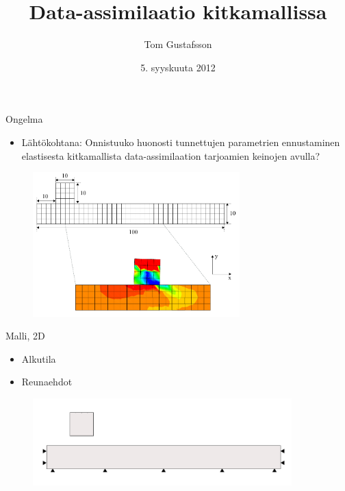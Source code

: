 \documentclass{beamer}
\title[Data-assimilaatio kitkamallissa]{Data-assimilaatio kitkamallissa}
\author{Tom Gustafsson}
\date{5. syyskuuta 2012}
\begin{document}
\begin{frame}
\titlepage
\end{frame}

\begin{frame}{Ongelma}

\begin{itemize}
\item Lähtökohtana: Onnistuuko huonosti tunnettujen parametrien ennustaminen elastisesta kitkamallista data-assimilaation tarjoamien keinojen avulla?
\end{itemize}

\begin{figure}
\includegraphics[width=8cm]{fretting_mesh.pdf}
\end{figure}

\end{frame}

\begin{frame}{Malli, 2D}

\begin{itemize}
\item Alkutila
\item Reunaehdot
\end{itemize}

\begin{figure}
\includegraphics[width=10cm]{fretting_geom.pdf}
\end{figure}

\end{frame}
\end{document}
